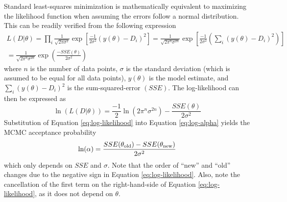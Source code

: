 \documentclass[preprint,review,11pt]{elsarticle}
\begin{document}
	Standard least-squares minimization is mathematically equivalent to maximizing the likelihood function when assuming the errors follow a normal distribution. This can be readily verified from the following expression
	\begin{multline} \label{eq:likelihood}
	L(D|\theta) = \prod_i \frac{1}{\sqrt{2 \pi \sigma^{2}}} \exp\left[\frac{-1}{2\sigma^2}(y(\theta)-D_i)^2\right] = \frac{1}{\sqrt{2 \pi^n \sigma^{2n}}} \exp\left[\frac{-1}{2\sigma^2}\left(\sum_i(y(\theta)-D_i)^2\right)\right] \\ = \frac{1}{\sqrt{2 \pi^n \sigma^{2n}}} \exp\left(\frac{-SSE(\theta)}{2\sigma^2}\right)
	\end{multline}
	where $n$ is the number of data points, $\sigma$ is the standard deviation (which is assumed to be equal for all data points), $y(\theta)$ is the model estimate, and $\sum_i(y(\theta)-D_i)^2$ is the sum-squared-error $(SSE)$. The log-likelihood can then be expressed as    
	\begin{equation} \label{eq:log-likelihood}
    \ln(L(D|\theta)) = \frac{-1}{2}\ln\left(2 \pi^n \sigma^{2n}\right) - \frac{SSE(\theta)}{2\sigma^2}
	\end{equation}  
	Substitution of Equation \ref{eq:log-likelihood} into Equation \ref{eq:log-alpha} yields the MCMC acceptance probability
	\begin{equation}
	\ln(\alpha) = \frac{SSE(\theta_{\rm old}) - SSE(\theta_{\rm new})}{2\sigma^2}
	\end{equation}
	which only depends on $SSE$ and $\sigma$. Note that the order of ``new'' and ``old'' changes due to the negative sign in Equation \ref{eq:log-likelihood}. Also, note the cancellation of the first term on the right-hand-side of Equation \ref{eq:log-likelihood}, as it does not depend on $\theta$.
	
	
\end{document}
